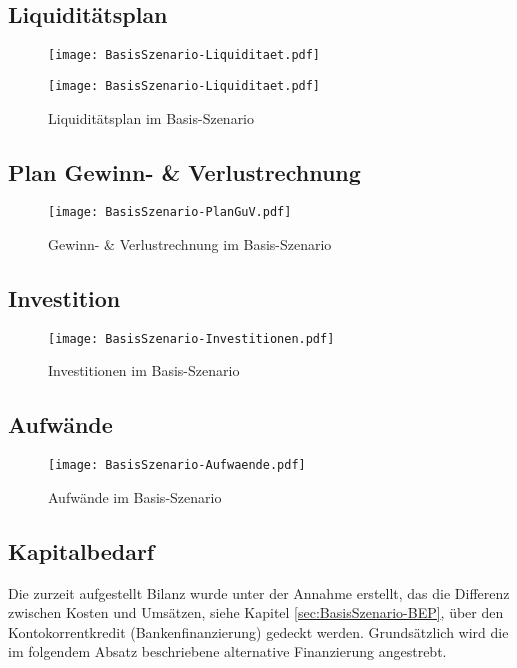 \newpage
\subsection{Liquiditätsplan}
\label{sec:BasisSzenario-Liquidität}
\begin{figure}[htp!]
	\centering
	\texttt{[image: BasisSzenario-Liquiditaet.pdf]}
	\label{fig:BasisSzenario-Liquiditaet-1}
\end{figure}
\begin{figure}[htp!]
	\centering
	\texttt{[image: BasisSzenario-Liquiditaet.pdf]}
	\caption{Liquiditätsplan im Basis-Szenario}
	\label{fig:BasisSzenario-Liquiditaet-2}
\end{figure}

\newpage
\subsection{Plan Gewinn- \& Verlustrechnung}
\begin{figure}[htp!]
	\centering
	\texttt{[image: BasisSzenario-PlanGuV.pdf]}
	\caption{Gewinn- \& Verlustrechnung im Basis-Szenario}
	\label{fig:BasisSzenario-GuV}
\end{figure}

\newpage
\subsection{Investition}
\begin{figure}[htp!]
	\centering
	\texttt{[image: BasisSzenario-Investitionen.pdf]}
	\caption{Investitionen im Basis-Szenario}
	\label{fig:BasisSzenario-Investitionen}
\end{figure}

\begin{landscape}
	\subsection{Aufwände}
	\begin{figure}[htp!]
		\centering
		\texttt{[image: BasisSzenario-Aufwaende.pdf]}
		\caption{Aufwände im Basis-Szenario}
		\label{fig:BasisSzenario-Aufwaende}
	\end{figure}
\end{landscape}

\subsection{Kapitalbedarf}
Die zurzeit aufgestellt Bilanz wurde unter der Annahme erstellt, das die Differenz zwischen Kosten und Umsätzen, siehe Kapitel \ref{sec:BasisSzenario-BEP}, über den Kontokorrentkredit (Bankenfinanzierung) gedeckt werden. Grundsätzlich wird die im folgendem Absatz beschriebene alternative Finanzierung angestrebt.

